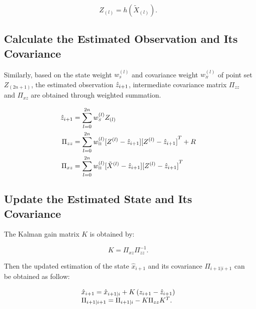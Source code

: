 \documentclass[sn-nature]{sn-jnl}%
\theoremstyle{thmstyleone}%
\theoremstyle{thmstyletwo}%
\theoremstyle{thmstylethree}%
\begin{document}
\begin{equation}
{Z_{(l)}} = h({{\tilde X}_{(l)}}).
\label{2_8}
\end{equation}

\subsection{Calculate the Estimated Observation and Its Covariance}

Similarly, based on the state weight ${w_{^S}^{(l)}}$ and covariance weight ${w_{^\Pi }^{(l)}}$ of point set ${Z_{(2n + 1)}}$, the estimated observation ${{\hat z}_{i{\rm{ + 1}}}}$, intermediate covariance matrix ${\Pi _{zz}}$ and ${\Pi _{xz}}$ are obtained through weighted summation.

\begin{equation}
\begin{aligned}
{{\hat z}_{i{\rm{ + 1}}}} &= \sum\limits_{l = 0}^{2n} {w_{^S}^{(l)}{Z_{(l)}}} \\
{\Pi _{zz}} &= \sum\limits_{l = 0}^{2n} {w_{^\Pi }^{(l)}[{Z^{(l)}} - {{\hat z}_{i{\rm{ + 1}}}}]{{[{Z^{(l)}} - {{\hat z}_{i{\rm{ + 1}}}}]}^T}}  + R\\
{\Pi _{xz}} &= \sum\limits_{l = 0}^{2n} {w_{^\Pi }^{(l)}[{{\tilde X}^{(l)}} - {{\hat z}_{i{\rm{ + 1}}}}]{{[{Z^{(l)}} - {{\hat z}_{i{\rm{ + 1}}}}]}^T}}
\end{aligned}
\label{2_9}
\end{equation}

\subsection{Update the Estimated State and Its Covariance}

The Kalman gain matrix $K$ is obtained by:

\begin{equation}
K = {\Pi _{xz}}\Pi _{zz}^{ - 1}.
\label{2_10}
\end{equation}

Then the updated estimation of the state ${{\hat x}_{i + 1}}$ and its covariance ${\Pi _{i + 1|i + 1}}$ can be obtained as follow:

\begin{equation}
\begin{array}{l}
{{\hat x}_{i + 1}} = {{\hat x}_{i + 1|i}} + K\left( {{z_{i + 1}} - {{\hat z}_{i{\rm{ + 1}}}}} \right)\\
{\Pi _{i + 1|i + 1}} = {\Pi _{i + 1|i}} - K{\Pi _{zz}}{K^T}.
\end{array}
\label{2_11}
\end{equation}
\end{document}
